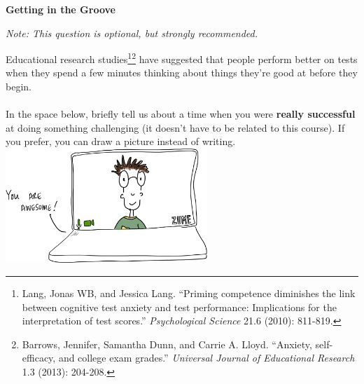 \documentclass[12pt]{article}
\newenvironment{question}[2][Question]{\begin{trivlist}
\item[\hskip \labelsep {\bfseries #1}\hskip \labelsep {\bfseries #2.}]}{\end{trivlist}}
\begin{document}
\clearpage
\begin{question}{0}\textbf{Getting in the Groove}
\begin{center}
\textit{Note: This question is optional, but strongly recommended.}
\end{center}
Educational research studies\footnote{Lang, Jonas WB, and Jessica Lang. ``Priming competence diminishes the link between cognitive test anxiety and test performance: Implications for the interpretation of test scores.'' \textit{Psychological Science} 21.6 (2010): 811-819.}\footnote{Barrows, Jennifer, Samantha Dunn, and Carrie A. Lloyd. ``Anxiety, self-efficacy, and college exam grades.'' \textit{Universal Journal of Educational Research} 1.3 (2013): 204-208.} have suggested that people perform better on tests when they spend a few minutes thinking about things they're good at before they begin.\\\\
In the space below, briefly tell us about a time when you were \textbf{really successful} at doing something challenging (it doesn't have to be related to this course). If you prefer, you can draw a picture instead of writing.
\vfill
\hfill
\includegraphics[width=3in]{youcandoit-zoom.jpg}
\end{question}
\clearpage
\end{document}
